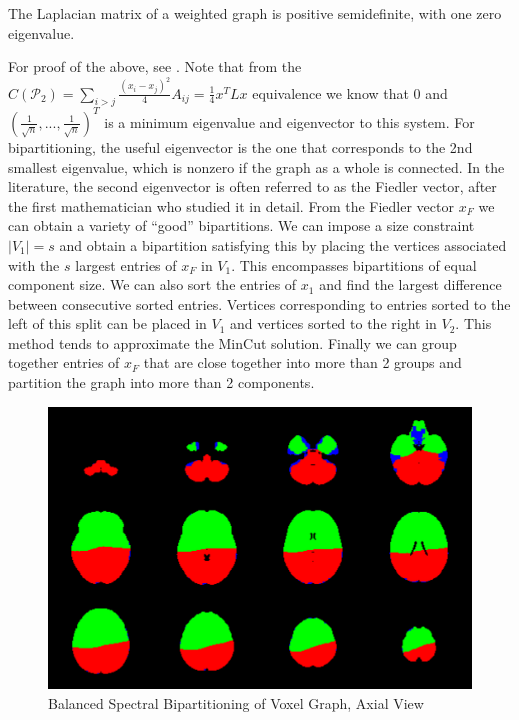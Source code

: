 \begin{theorem} \label{Laplacian_psd}
The Laplacian matrix of a weighted graph is positive semidefinite, with
one zero eigenvalue.
\end{theorem}

For proof of the above, see \cite{mohar1991laplacian}. Note that from
the
$C(\mathcal{P}_2) = \sum_{i > j} \frac{(x_i - x_j)^2}{4} A_{ij}
        = \frac{1}{4} x^T L x$ equivalence we know that
$0$ and $(\frac{1}{\sqrt{n}}, ..., \frac{1}{\sqrt{n}})^T$ is a minimum
eigenvalue and eigenvector to this system. For bipartitioning, the
useful eigenvector is the one that corresponds to the 2nd smallest
eigenvalue, which is nonzero if the graph as a whole is connected.
In the literature, the second eigenvector is often referred to as the
Fiedler vector, after the first mathematician who studied it in detail.
From the Fiedler vector $x_F$ we can obtain a variety of ``good''
bipartitions. We can impose a size constraint $|V_1| = s$ and obtain a
bipartition satisfying this by placing the vertices associated with the
$s$ largest entries of $x_F$ in $V_1$. This encompasses bipartitions of
equal component size. We can also sort the entries of $x_1$ and find the
largest difference between consecutive sorted entries. Vertices
corresponding to entries sorted to the left of this split can be placed
in $V_1$ and vertices sorted to the right in $V_2$. This method tends to
approximate the MinCut solution. Finally we can group together entries
of $x_F$ that are close together into more than 2 groups and partition
the graph into more than 2 components.

\begin{figure}
\caption{Balanced Spectral Bipartitioning of Voxel Graph, %
Axial View}
\label{sp_bi}
\begin{center}
\includegraphics[scale = 0.5]{figs/5_spectral_2_axial.png}
\end{center}
\end{figure}

